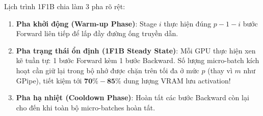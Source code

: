 Lịch trình 1F1B chia làm 3 pha rõ rệt:
\begin{enumerate}
  \item \textbf{Pha khởi động (Warm-up Phase)}: Stage $i$ thực hiện đúng $p - 1 - i$ bước Forward liên tiếp để lấp đầy đường ống truyền dẫn.
  \item \textbf{Pha trạng thái ổn định (1F1B Steady State)}: Mỗi GPU thực hiện xen kẽ tuần tự: 1 bước Forward kèm 1 bước Backward. Số lượng micro-batch kích hoạt cần giữ lại trong bộ nhớ được chặn trên tối đa ở mức $p$ (thay vì $m$ như GPipe), tiết kiệm tới $\mathbf{70\% - 85\%}$ dung lượng VRAM lưu activation!
  \item \textbf{Pha hạ nhiệt (Cooldown Phase)}: Hoàn tất các bước Backward còn lại cho đến khi toàn bộ micro-batches hoàn tất.
\end{enumerate}


